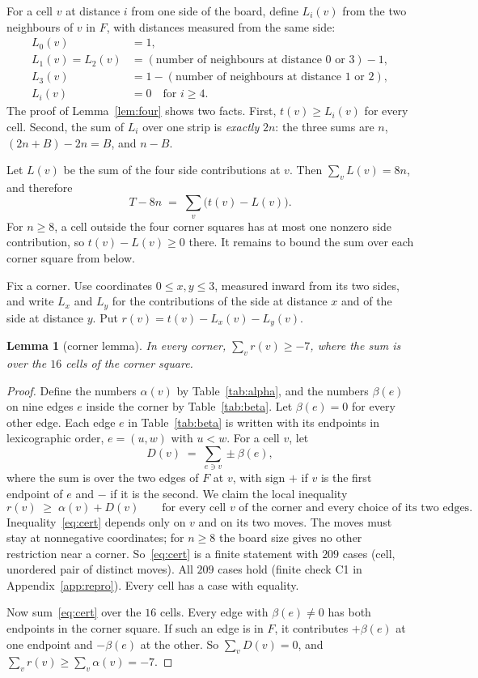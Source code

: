 \documentclass[11pt]{article}
\newtheorem{lemma}[theorem]{Lemma}
\theoremstyle{definition}
\theoremstyle{remark}
\begin{document}
For a cell $v$ at distance $i$ from one side of the board, define $L_i(v)$ from the two neighbours of $v$ in $F$, with distances measured from the same side:
\begin{align*}
L_0(v) &= 1,\\
L_1(v) = L_2(v) &= (\text{number of neighbours at distance $0$ or $3$}) - 1,\\
L_3(v) &= 1 - (\text{number of neighbours at distance $1$ or $2$}),\\
L_i(v) &= 0 \quad\text{for } i\ge4.
\end{align*}
The proof of Lemma~\ref{lem:four} shows two facts.
First, $t(v)\ge L_i(v)$ for every cell.
Second, the sum of $L_i$ over one strip is \emph{exactly} $2n$: the three sums are $n$, $(2n+B)-2n=B$, and $n-B$.

Let $L(v)$ be the sum of the four side contributions at $v$.
Then $\sum_v L(v)=8n$, and therefore
\[ T-8n \;=\; \sum_v \bigl(t(v)-L(v)\bigr). \]
For $n\ge8$, a cell outside the four corner squares has at most one nonzero side contribution, so $t(v)-L(v)\ge 0$ there.
It remains to bound the sum over each corner square from below.

Fix a corner.
Use coordinates $0\le x,y\le 3$, measured inward from its two sides, and write $L_x$ and $L_y$ for the contributions of the side at distance $x$ and of the side at distance $y$.
Put $r(v)=t(v)-L_x(v)-L_y(v)$.

\begin{lemma}[corner lemma]\label{lem:corner}
In every corner, $\sum_{v} r(v)\ge -7$, where the sum is over the $16$ cells of the corner square.
\end{lemma}

\begin{proof}
Define the numbers $\alpha(v)$ by Table~\ref{tab:alpha}, and the numbers $\beta(e)$ on nine edges $e$ inside the corner by Table~\ref{tab:beta}.
Let $\beta(e)=0$ for every other edge.
Each edge $e$ in Table~\ref{tab:beta} is written with its endpoints in lexicographic order, $e=(u,w)$ with $u<w$.
For a cell $v$, let
\[ D(v) \;=\; \sum_{e\ni v} \pm\beta(e), \]
where the sum is over the two edges of $F$ at $v$, with sign $+$ if $v$ is the first endpoint of $e$ and $-$ if it is the second.
We claim the local inequality
\begin{equation}\label{eq:cert}
r(v)\;\ge\;\alpha(v)+D(v)\qquad\text{for every cell $v$ of the corner and every choice of its two edges.}
\end{equation}
Inequality~\eqref{eq:cert} depends only on $v$ and on its two moves.
The moves must stay at nonnegative coordinates; for $n\ge8$ the board size gives no other restriction near a corner.
So~\eqref{eq:cert} is a finite statement with $209$ cases (cell, unordered pair of distinct moves).
All $209$ cases hold (finite check C1 in Appendix~\ref{app:repro}).
Every cell has a case with equality.

Now sum~\eqref{eq:cert} over the $16$ cells.
Every edge with $\beta(e)\ne0$ has both endpoints in the corner square.
If such an edge is in $F$, it contributes $+\beta(e)$ at one endpoint and $-\beta(e)$ at the other.
So $\sum_v D(v)=0$, and $\sum_v r(v)\ge\sum_v\alpha(v)=-7$.
\end{proof}
\end{document}

